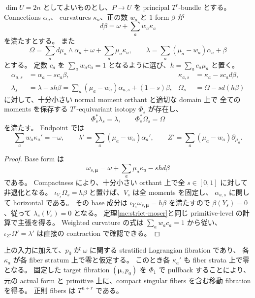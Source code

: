 \begin{proposition}
\label{mc:multi-straightening}
$\dim U=2n$ としてよいものとし、$P\to U$ を principal $T^r$-bundle とする。
Connections $\alpha_a$、
curvatures $\kappa_a$、正の数 $w_a$ と $1$-form $\beta$ が
\[
 d\beta=\omega+\sum_a w_a\kappa_a
\]
を満たすとする。
また
\[
 \Omega=\sum_a d\mu_a\wedge\alpha_a+\omega+\sum_a\mu_a\kappa_a,
 \qquad
 \lambda=\sum_a(\mu_a-w_a)\alpha_a+\beta
\]
とする。
定数 $c_a$ を $\sum_aw_ac_a=1$ となるように選び、$h=\sum_ac_a\mu_a$ と置く。
\begin{align*}
 \alpha_{a,s}&=\alpha_a-sc_a\beta,
 &\kappa_{a,s}&=\kappa_a-sc_ad\beta,\\
 \lambda_s&=\lambda-sh\beta
 =\sum_a(\mu_a-w_a)\alpha_{a,s}+(1-s)\beta,
 &\Omega_s&=\Omega-sd(h\beta)
\end{align*}
に対して、十分小さい normal moment orthant と適切な domain 上で
全ての moments を保存する $T^r$-equivariant isotopy $\Phi_s$ が存在し、
\[
 \Phi_s^*\lambda_s=\lambda,
 \qquad \Phi_s^*\Omega_s=\Omega
\]
を満たす。
Endpoint では
\[
 \sum_a w_a\kappa_a'=-\omega,
 \qquad \lambda'=\sum_a(\mu_a-w_a)\alpha_a',
 \qquad Z'=\sum_a(\mu_a-w_a)\partial_{\mu_a}.
\]
\end{proposition}

\begin{proof}
Base form は
\[
 \omega_{s,\boldsymbol\mu}
 =\omega+\sum_a\mu_a\kappa_a-shd\beta
\]
である。
Compactness により、十分小さい orthant 上で全 $s\in[0,1]$ に対して非退化となる。
$\iota_{V_s}\Omega_s=h\beta$ と置けば、$V_s$ は全 moments を固定し、
$\alpha_{a,s}$ に関して horizontal である。
その base 成分は $\iota_{Y_s}\omega_{s,\boldsymbol\mu}=h\beta$ を満たすので
$\beta(Y_s)=0$、従って $\lambda_s(V_s)=0$ となる。
定理\ref{mc:strict-moser}と同じ primitive-level の計算で主張を得る。
Weighted curvature の式は $\sum_aw_ac_a=1$ から従い、
$\iota_{Z'}\Omega'=\lambda'$ は直接の contraction で確認できる。
\end{proof}

\begin{corollary}
\label{mc:multi-fibration}
上の入力に加えて、$p_0$ が $\omega$ に関する stratified Lagrangian fibration であり、
各 $\kappa_a$ が各 fiber stratum 上で零と仮定する。
このとき各 $\kappa_a'$ も fiber strata 上で零となる。
固定した target fibration $(\boldsymbol\mu,p_0)$ を $\Phi_1$ で pullback することにより、
元の actual form と primitive 上に、compact singular fibers を含む移動 fibration を得る。
正則 fibers は $T^{n+r}$ である。
\end{corollary}

